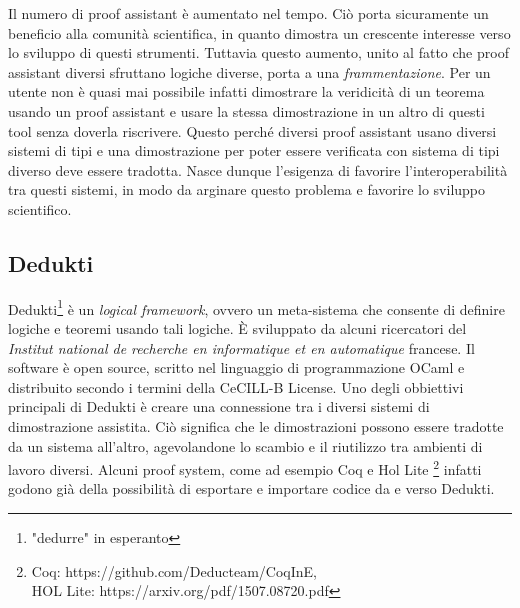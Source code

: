 \documentclass[12pt,a4paper]{report}
\begin{document}
Il numero di proof assistant è aumentato nel tempo. Ciò porta sicuramente un
beneficio alla comunità scientifica, in quanto dimostra un crescente interesse
verso lo sviluppo di questi strumenti. Tuttavia questo aumento, unito al fatto
che proof assistant diversi sfruttano logiche diverse, porta a una \textit{
frammentazione}. Per un utente non è quasi mai possibile infatti dimostrare la
veridicità di un teorema usando un proof assistant e usare la stessa dimostrazione
in un altro di questi tool senza doverla riscrivere.
Questo perché diversi proof assistant usano diversi sistemi di tipi e una dimostrazione
per poter essere verificata con sistema di tipi diverso deve essere tradotta.
Nasce dunque l'esigenza di favorire l'interoperabilità tra questi sistemi, in
modo da arginare questo problema e favorire lo sviluppo scientifico. 

\subsection{Dedukti}
Dedukti\footnote{"dedurre" in esperanto} è un \textit{logical framework}, ovvero
un meta-sistema che consente di definire logiche e teoremi usando tali logiche.
È sviluppato da alcuni ricercatori del \textit{Institut national de recherche
en informatique et en automatique} francese. Il software è open source, scritto
nel linguaggio di programmazione OCaml e distribuito secondo i termini della
CeCILL-B License. Uno degli obbiettivi principali di Dedukti è creare
una connessione tra i diversi sistemi di dimostrazione assistita. Ciò significa
che le dimostrazioni possono essere tradotte da un sistema all'altro, agevolandone
lo scambio e il riutilizzo tra ambienti di lavoro diversi.
Alcuni proof system, come ad esempio Coq e Hol Lite \footnote{Coq: https://github.com/Deducteam/CoqInE,\\ HOL Lite: https://arxiv.org/pdf/1507.08720.pdf}
infatti godono già della possibilità di esportare e importare codice da e verso
Dedukti.
\end{document}
